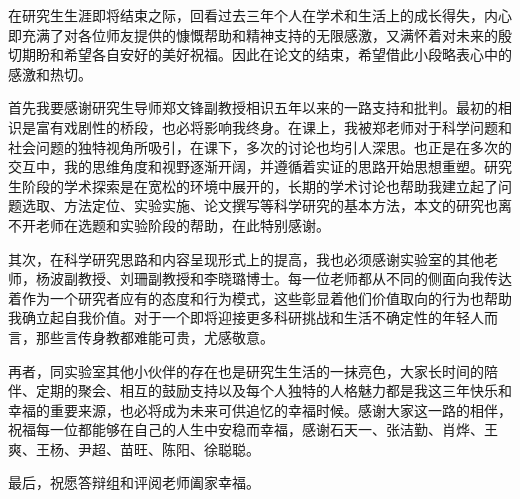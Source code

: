 
\thesisacknowledgement
在研究生生涯即将结束之际，回看过去三年个人在学术和生活上的成长得失，内心即充满了对各位师友提供的慷慨帮助和精神支持的无限感激，又满怀着对未来的殷切期盼和希望各自安好的美好祝福。因此在论文的结束，希望借此小段略表心中的感激和热切。

首先我要感谢研究生导师郑文锋副教授相识五年以来的一路支持和批判。最初的相识是富有戏剧性的桥段，也必将影响我终身。在课上，我被郑老师对于科学问题和社会问题的独特视角所吸引，在课下，多次的讨论也均引人深思。也正是在多次的交互中，我的思维角度和视野逐渐开阔，并遵循着实证的思路开始思想重塑。研究生阶段的学术探索是在宽松的环境中展开的，长期的学术讨论也帮助我建立起了问题选取、方法定位、实验实施、论文撰写等科学研究的基本方法，本文的研究也离不开老师在选题和实验阶段的帮助，在此特别感谢。

其次，在科学研究思路和内容呈现形式上的提高，我也必须感谢实验室的其他老师，杨波副教授、刘珊副教授和李晓璐博士。每一位老师都从不同的侧面向我传达着作为一个研究者应有的态度和行为模式，这些彰显着他们价值取向的行为也帮助我确立起自我价值。对于一个即将迎接更多科研挑战和生活不确定性的年轻人而言，那些言传身教都难能可贵，尤感敬意。

再者，同实验室其他小伙伴的存在也是研究生生活的一抹亮色，大家长时间的陪伴、定期的聚会、相互的鼓励支持以及每个人独特的人格魅力都是我这三年快乐和幸福的重要来源，也必将成为未来可供追忆的幸福时候。感谢大家这一路的相伴，祝福每一位都能够在自己的人生中安稳而幸福，感谢石天一、张洁勤、肖烨、王爽、王杨、尹超、苗旺、陈阳、徐聪聪。

最后，祝愿答辩组和评阅老师阖家幸福。

